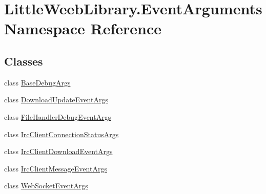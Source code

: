 \hypertarget{namespace_little_weeb_library_1_1_event_arguments}{}\section{Little\+Weeb\+Library.\+Event\+Arguments Namespace Reference}
\label{namespace_little_weeb_library_1_1_event_arguments}
\subsection*{Classes}
\begin{DoxyCompactItemize}
\item 
class \mbox{\hyperlink{class_little_weeb_library_1_1_event_arguments_1_1_base_debug_args}{Base\+Debug\+Args}}
\item 
class \mbox{\hyperlink{class_little_weeb_library_1_1_event_arguments_1_1_download_update_event_args}{Download\+Update\+Event\+Args}}
\item 
class \mbox{\hyperlink{class_little_weeb_library_1_1_event_arguments_1_1_file_handler_debug_event_args}{File\+Handler\+Debug\+Event\+Args}}
\item 
class \mbox{\hyperlink{class_little_weeb_library_1_1_event_arguments_1_1_irc_client_connection_status_args}{Irc\+Client\+Connection\+Status\+Args}}
\item 
class \mbox{\hyperlink{class_little_weeb_library_1_1_event_arguments_1_1_irc_client_download_event_args}{Irc\+Client\+Download\+Event\+Args}}
\item 
class \mbox{\hyperlink{class_little_weeb_library_1_1_event_arguments_1_1_irc_client_message_event_args}{Irc\+Client\+Message\+Event\+Args}}
\item 
class \mbox{\hyperlink{class_little_weeb_library_1_1_event_arguments_1_1_web_socket_event_args}{Web\+Socket\+Event\+Args}}
\end{DoxyCompactItemize}
